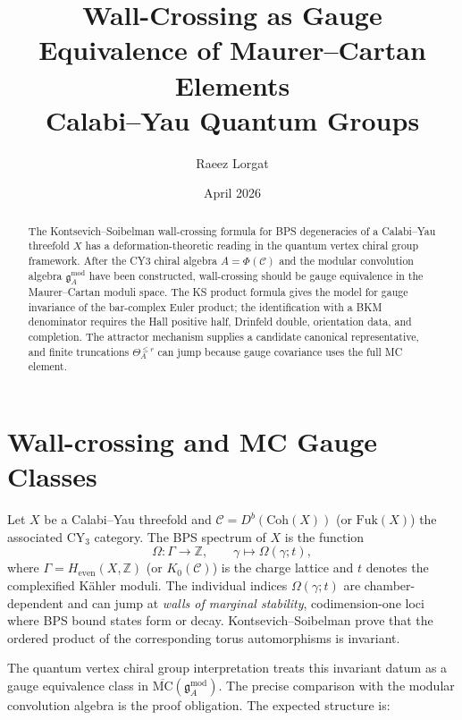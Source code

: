 \documentclass[11pt]{article}
\title{Wall-Crossing as Gauge Equivalence of Maurer--Cartan Elements\\[6pt]
\large Calabi--Yau Quantum Groups}
\author{Raeez Lorgat}
\date{April 2026}
\theoremstyle{definition}
\theoremstyle{remark}
\newcommand{\frakg}{\mathfrak{g}}
\newcommand{\MC}{\mathrm{MC}}
\newcommand{\Coh}{\mathrm{Coh}}
\newcommand{\Fuk}{\mathrm{Fuk}}
\newcommand{\cC}{\mathcal{C}}
\begin{document}
\maketitle

\begin{abstract}
The Kontsevich--Soibelman wall-crossing formula for BPS degeneracies of a
Calabi--Yau threefold $X$ has a deformation-theoretic reading in the quantum
vertex chiral group framework. After the CY3 chiral algebra
$A=\Phi(\cC)$ and the modular convolution algebra
$\frakg^{\mathrm{mod}}_A$ have been constructed, wall-crossing should be
gauge equivalence in the Maurer--Cartan moduli space. The KS product
formula gives the model for gauge invariance of the bar-complex Euler
product; the identification with a BKM denominator requires the Hall
positive half, Drinfeld double, orientation data, and completion. The
attractor mechanism supplies a candidate canonical representative, and
finite truncations $\Theta^{\leq r}_A$ can jump because gauge covariance
uses the full MC element.
\end{abstract}

\tableofcontents

\section{Wall-crossing and MC Gauge Classes}
\label{sec:wc-intro}

Let $X$ be a Calabi--Yau threefold and $\cC = D^b(\Coh(X))$ (or $\Fuk(X)$)
the associated CY$_3$ category. The BPS spectrum of $X$ is the function
\[
 \Omega \colon \Gamma \longrightarrow \mathbb{Z}, \qquad
 \gamma \longmapsto \Omega(\gamma; t),
\]
where $\Gamma = H_{\mathrm{even}}(X, \mathbb{Z})$ (or $K_0(\cC)$) is the
charge lattice and $t$ denotes the complexified K\"ahler moduli. The
individual indices $\Omega(\gamma;t)$ are chamber-dependent and can jump
at \emph{walls of marginal stability}, codimension-one loci where BPS
bound states form or decay. Kontsevich--Soibelman \cite{KS08} prove that
the ordered product of the corresponding torus automorphisms is invariant.

The quantum vertex chiral group interpretation treats this invariant
datum as a gauge equivalence class in
$\overline{\MC}(\frakg^{\mathrm{mod}}_A)$. The precise comparison with
the modular convolution algebra is the proof obligation. The expected
structure is:
\end{document}
